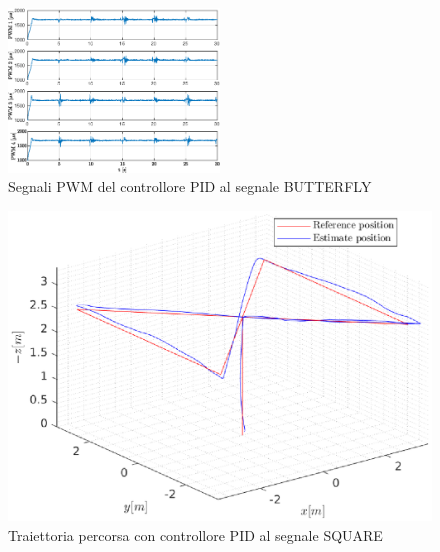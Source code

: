 \begin{figure}
	\centering
	\includegraphics[width=0.5\textwidth]{Simulazioni/Figure/PID/BUTTERFLY/PWM}
	\caption{Segnali PWM del controllore PID al segnale BUTTERFLY}
	\label{fig:BUTTERFLYPWMPID}
\end{figure}
\begin{figure}
	\centering
	\includegraphics[width=1\textwidth]{Simulazioni/Figure/PID/BUTTERFLY/Trajectory}
	\caption{Traiettoria percorsa con controllore PID al segnale SQUARE}
	\label{fig:BUTTERFLYtraPID}
\end{figure}


